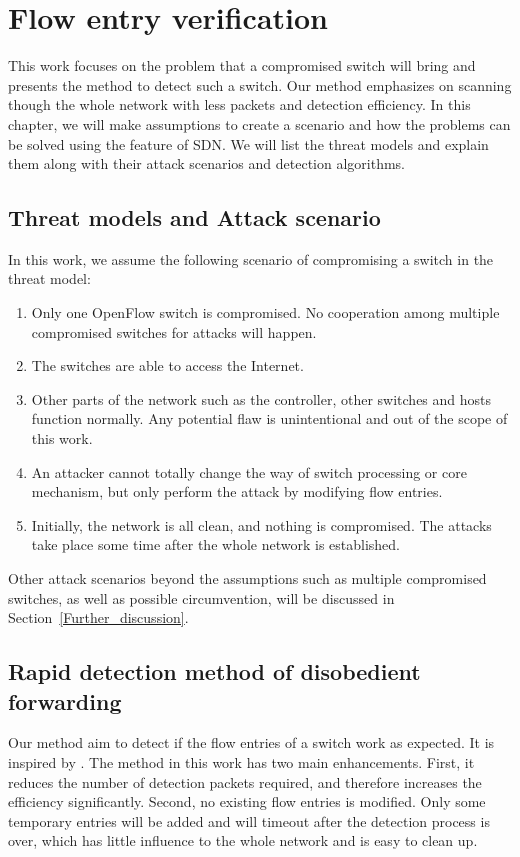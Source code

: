 \chapter{Flow entry verification}
This work focuses on the problem that a compromised switch will bring and presents the method to detect such a switch. Our method emphasizes on scanning though the whole network with less packets and detection efficiency. In this chapter, we will make assumptions to create a scenario and how the problems can be solved using the feature of SDN. We will list the threat models and explain them along with their attack scenarios and detection algorithms.

\section{Threat models and Attack scenario}
In this work, we assume the following scenario of compromising a switch in the threat model:
\begin{enumerate}
\item
Only one OpenFlow switch is compromised. No cooperation among multiple compromised switches for attacks will happen. 
\item
The switches are able to access the Internet. 
\item
Other parts of the network such as the controller, other switches and hosts function normally. Any potential flaw is unintentional and out of the scope of this work.
\item
An attacker cannot totally change the way of switch processing or core mechanism, but only perform the attack by modifying flow entries.
\item
Initially, the network is all clean, and nothing is compromised. The attacks take place some time after the whole network is established.
\end{enumerate}

Other attack scenarios beyond the assumptions such as multiple compromised switches, as well as possible circumvention, will be discussed in Section~\ref{Further_discussion}.

\section{Rapid detection method of disobedient forwarding}
Our method aim to detect if the flow entries of a switch work as expected. It is inspired by \cite{CKGL15}. The method in this work has two main enhancements. First, it reduces the number of detection packets required, and therefore increases the efficiency significantly. Second, no existing flow entries is modified. Only some temporary entries will be added and will timeout after the detection process is over, which has little influence to the whole network and is easy to clean up. 

